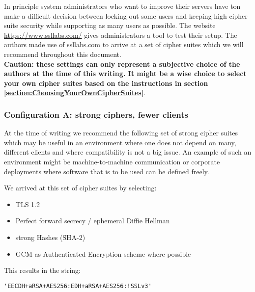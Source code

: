
In principle system administrators who want to improve their servers have ton
make a difficult decision between locking out some users and keeping high
cipher suite security while supporting as many users as possible.
The website \url{https://www.ssllabs.com/} gives administrators a
tool to test their setup. The authors made use of ssllabs.com
to arrive at a set of cipher suites which we will recommend throughout this
document.\\

\textbf{Caution: these settings can only represent a subjective
choice of the authors at the time of this writing. It might be a wise choice to
select your own cipher suites based on the instructions in section
\ref{section:ChoosingYourOwnCipherSuites}}.


\subsubsection{Configuration A: strong ciphers, fewer clients}

At the time of writing we recommend the following set of strong cipher
suites which may be useful in an environment where one does not depend on many,
different clients and where compatibility is not a big issue.  An example
of such an environment might be machine-to-machine communication or corporate
deployments where software that is to be used can be defined freely.


We arrived at this set of cipher suites by selecting:

\begin{itemize}
\item TLS 1.2
\item Perfect forward secrecy / ephemeral Diffie Hellman
\item strong Hashes (SHA-2)
\item GCM as Authenticated Encryption scheme where possible
\end{itemize}

This results in the string:

\begin{lstlisting}[breaklines]
'EECDH+aRSA+AES256:EDH+aRSA+AES256:!SSLv3'
\end{lstlisting}

%



